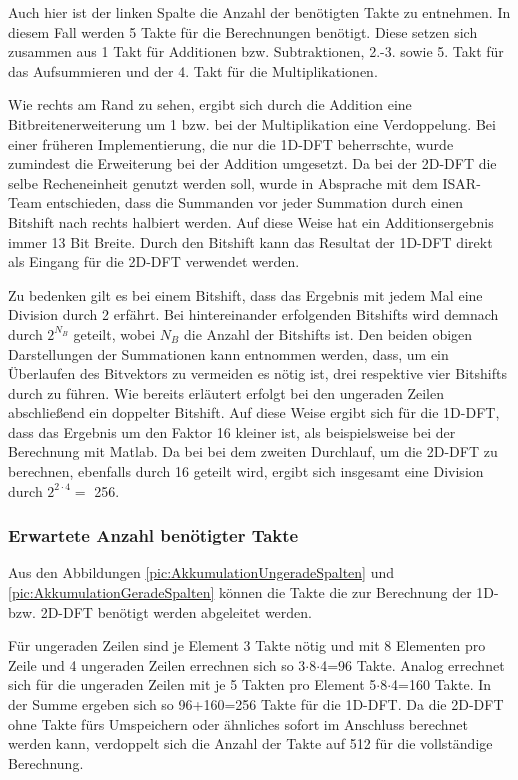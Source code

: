 \vspace{1cm}
Auch hier ist der linken Spalte die Anzahl der benötigten Takte zu entnehmen. In diesem Fall werden 5 Takte für die Berechnungen benötigt. Diese setzen sich zusammen aus
1 Takt für Additionen bzw. Subtraktionen, 2.-3. sowie 5. Takt für das Aufsummieren und der 4. Takt für die Multiplikationen.

Wie rechts am Rand zu sehen, ergibt sich durch die Addition eine Bitbreitenerweiterung um 1 bzw. bei der Multiplikation eine Verdoppelung. Bei einer früheren 
Implementierung, die nur die 1D-DFT beherrschte, wurde zumindest die Erweiterung bei der Addition umgesetzt. Da bei der 2D-DFT die selbe Recheneinheit genutzt 
werden soll, wurde in Absprache mit dem ISAR-Team entschieden, dass die Summanden vor jeder Summation durch einen Bitshift nach rechts halbiert werden. Auf diese
Weise hat ein Additionsergebnis immer 13 Bit Breite. Durch den Bitshift kann das Resultat der 1D-DFT direkt als Eingang für die 2D-DFT verwendet werden. 

Zu bedenken gilt es bei einem Bitshift, dass das Ergebnis mit jedem Mal eine Division durch 2 erfährt. Bei hintereinander erfolgenden Bitshifts wird demnach durch $2^{N_B}$ geteilt, 
wobei $N_B$ die Anzahl der Bitshifts ist. Den beiden obigen Darstellungen der Summationen kann entnommen werden, dass, um ein Überlaufen des Bitvektors zu vermeiden es nötig ist,
drei respektive vier Bitshifts durch zu führen. Wie bereits erläutert erfolgt bei den ungeraden Zeilen abschließend ein doppelter Bitshift. Auf diese Weise ergibt sich für die
1D-DFT, dass das Ergebnis um den Faktor 16 kleiner ist, als beispielsweise bei der Berechnung mit Matlab. Da bei bei dem zweiten Durchlauf, um die 2D-DFT zu berechnen, ebenfalls 
durch 16 geteilt wird, ergibt sich insgesamt eine Division durch $2^{2\cdot4} = $ 256.

\subsubsection{Erwartete Anzahl benötigter Takte}
Aus den Abbildungen \ref{pic:AkkumulationUngeradeSpalten} und \ref{pic:AkkumulationGeradeSpalten} können die Takte die zur Berechnung der 1D- bzw. 2D-DFT benötigt werden 
abgeleitet werden.

Für ungeraden Zeilen sind je Element 3 Takte nötig und mit 8 Elementen pro Zeile und 4 ungeraden Zeilen errechnen sich so 3$\cdot$8$\cdot$4=96 Takte.
Analog errechnet sich für die ungeraden Zeilen mit je 5 Takten pro Element 5$\cdot$8$\cdot$4=160 Takte.
In der Summe ergeben sich so 96+160=256 Takte für die 1D-DFT. Da die 2D-DFT ohne Takte fürs Umspeichern oder ähnliches sofort im Anschluss berechnet werden kann, 
verdoppelt sich die Anzahl der Takte auf 512 für die vollständige Berechnung.




